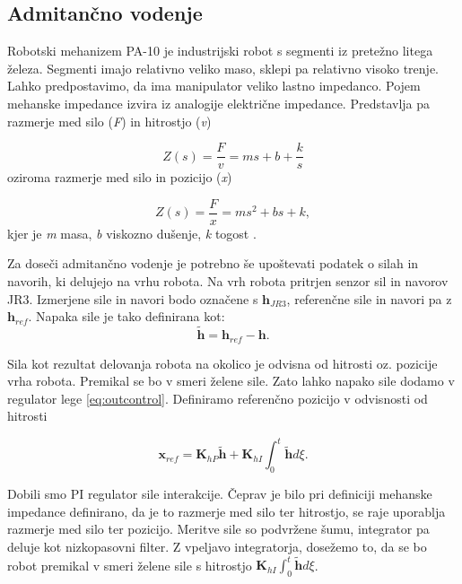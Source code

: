 \documentclass[a4paper]{article}
\begin{document}
\subsection{Admitančno vodenje} \label{sec:vodenje-admitance}

Robotski mehanizem PA-10 je industrijski robot s segmenti iz pretežno litega železa. Segmenti imajo relativno veliko maso, sklepi pa relativno visoko trenje. Lahko predpostavimo, da ima manipulator veliko lastno impedanco. Pojem mehanske impedance izvira iz analogije električne impedance. Predstavlja pa razmerje med silo (\textit{F}) in hitrostjo (\textit{v}) 

\begin{equation}
Z(s) = \frac{F}{v} = ms + b + \frac{k}{s}
\end{equation}
oziroma razmerje med silo in pozicijo (\textit{x})

\begin{equation}
Z(s) = \frac{F}{x} = ms^2 + bs + k,
\end{equation}
kjer je \textit{m} masa, \textit{b} viskozno dušenje, \textit{k} togost \cite{mihelj_hapt}.



Za doseči admitančno vodenje je potrebno še upoštevati podatek o silah in navorih, ki delujejo na vrhu robota. Na vrh robota pritrjen senzor sil in navorov JR3. Izmerjene sile in navori bodo označene s $\textbf{h}_{JR3}$, referenčne sile in navori pa z $\textbf{h}_{ref}$. Napaka sile je tako definirana kot:
\begin{equation} \label{eq:herr}
\tilde{\textbf{h}} = \textbf{h}_{ref} - \textbf{h}.
\end{equation}

Sila kot rezultat delovanja robota na okolico je odvisna od hitrosti oz. pozicije vrha robota. Premikal se bo v smeri želene sile. Zato lahko napako sile dodamo v regulator lege \ref{eq:outcontrol}. Definiramo referenčno pozicijo v odvisnosti od hitrosti

\begin{equation} \label{eq:xrefforce}
\textbf{x}_{ref} = \textbf{K}_{hP}\tilde{\textbf{h}} + \textbf{K}_{hI} \int_{0}^{t}\tilde{\textbf{h}}d\xi.
\end{equation}

Dobili smo PI regulator sile interakcije. Čeprav je bilo pri definiciji mehanske impedance definirano, da je to razmerje med silo ter hitrostjo, se raje uporablja razmerje med silo ter pozicijo. Meritve sile so podvržene šumu, integrator pa deluje kot nizkopasovni filter. Z vpeljavo integratorja, dosežemo to, da se bo robot premikal v smeri želene sile s hitrostjo $\textbf{K}_{hI} \int_{0}^{t}\tilde{\textbf{h}}d\xi$.
\end{document}

